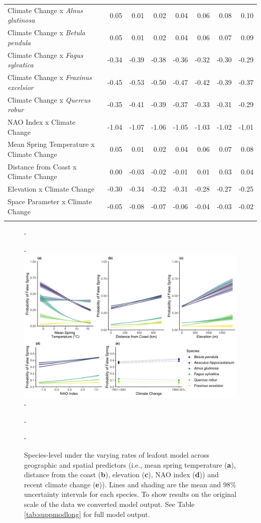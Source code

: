 \documentclass{article}\usepackage[]{graphicx}\usepackage[]{color}
\begin{document}
\begin{longtable}{lrrrrrrr}
  Climate Change
x\textit{ Alnus glutinosa} & 0.05 & 0.01 & 0.02 & 0.04 & 0.06 & 0.08 & 0.10 \\ 
  Climate Change
x\textit{ Betula pendula} & 0.05 & 0.01 & 0.02 & 0.04 & 0.06 & 0.07 & 0.09 \\ 
  Climate Change
x\textit{ Fagus sylvatica} & -0.34 & -0.39 & -0.38 & -0.36 & -0.32 & -0.30 & -0.29 \\ 
  Climate Change
x\textit{ Fraxinus excelsior} & -0.45 & -0.53 & -0.50 & -0.47 & -0.42 & -0.39 & -0.37 \\ 
  Climate Change
x\textit{ Quercus robur} & -0.35 & -0.41 & -0.39 & -0.37 & -0.33 & -0.31 & -0.29 \\ 
  NAO Index x Climate Change & -1.04 & -1.07 & -1.06 & -1.05 & -1.03 & -1.02 & -1.01 \\ 
  Mean Spring 
Temperature x Climate Change & 0.05 & 0.01 & 0.02 & 0.04 & 0.06 & 0.07 & 0.08 \\ 
  Distance from 
Coast x Climate Change & 0.00 & -0.03 & -0.02 & -0.01 & 0.01 & 0.03 & 0.04 \\ 
  Elevation x Climate Change & -0.30 & -0.34 & -0.32 & -0.31 & -0.28 & -0.27 & -0.25 \\ 
  Space Parameter x Climate Change & -0.05 & -0.08 & -0.07 & -0.06 & -0.04 & -0.03 & -0.02 \\ 
   \hline
\hline
\label{tab:suppmoddvr}
\end{longtable}


{\begin{figure} [H]
  -\begin{center}
  -\includegraphics[width=12cm]{..//..//analyses/figures/InteractionPlots/Species_dvrlong.png}
  -\caption{Species-level under the varying rates of leafout model across geographic and spatial predictors (i.e., mean spring temperature (\textbf{a}), distance from the coast (\textbf{b}), elevation (\textbf{c}), NAO index (\textbf{d})) and recent climate change (\textbf{e})). Lines and shading are the mean and 98\% uncertainty intervals for each species. To show results on the original scale of the data we converted model output. See Table \ref{tab:suppmodlong} for full model output. }\label{fig:sppdvr}
  -\end{center}
  -\end{figure}}
\end{document}
